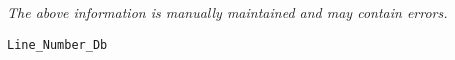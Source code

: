 \label{pkg:line\_number\_db}

{\tiny \it The above information is manually maintained and may contain errors.}
\begin{verbatim}
Line_Number_Db
\end{verbatim}
